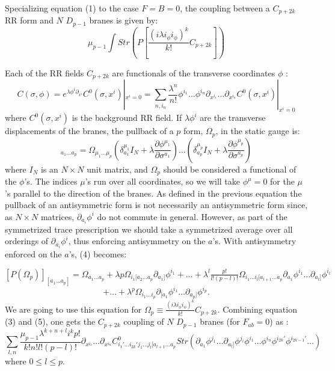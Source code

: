 \documentclass[a4paper,12pt]{article}
\begin{document}
Specializing equation (1) to the case $F=B=0$, the coupling between a $C_{p+2k}$ RR form and $N$ $D_{p-1}$ branes is given by:
\begin{equation}
 \mu_{p-1}\int Str\left(P\left[\frac{\left(i\lambda i_\phi i_\phi \right)^k}{k!} C_{p+2k} \right]\right)
\end{equation}

Each of the  RR fields $C_{p+2k}$ are functionals of the transverse coordinates $\phi$ :
\begin{equation}
C(\sigma,\phi) = e^{\lambda\phi^i\partial_{x^i}} C^0(\sigma,x^i)|_{x^i=0}=\sum_{n,{i_n}} \frac {\lambda^n}{n!} \phi^{i_1}\ldots \phi^{i_n} \partial_{x^{i_1}}\ldots \partial_{x^{i_n}} C^0(\sigma,x^i)|_{x^i=0}
\end{equation}
where $C^0(\sigma,x^i)$ is the background RR field.
If $\lambda \phi^i$ are the transverse displacements of the branes, the pullback of a $p$  form, $\Omega_p$, in the static gauge is:
\begin{equation}
[P(\Omega_p)]_{a_1\ldots a_p}= \Omega_{\mu_1\ldots \mu_p}\left(\delta_{a_1}^{\mu_1}I_N+\lambda\frac{\partial\phi^{\mu_1}}{\partial\sigma^{a_1}}\right)\ldots \left(\delta_{a_p}^{\mu_p}I_N+\lambda\frac{\partial\phi^{\mu_p}}{\partial\sigma^{a_p}}\right)
\end{equation}
where $I_N$  is an $N \times N$ unit matrix, and $\Omega_p$ should be considered a functional of the $\phi$'s.
The indices  $\mu$'s run over all coordinates, so we will take $\phi^\mu=0$ for the $\mu$'s parallel to the direction of the branes. As defined in the previous equation the pullback of an antisymmetric form is not necessarily an antisymmetric form since, as $N \times N$ matrices, $\partial_{a_i}\phi^i$ do not commute in general. However, as part of the symmetrized trace prescription we should take a symmetrized average over all orderings of $\partial_{a_i}\phi^i$, thus enforcing antisymmetry on  the $a$'s. \newline
 With antisymmetry enforced  on the $a$'s, (4) becomes: 

$[P(\Omega_p)]_{[a_1\ldots a_p]} = \Omega_{a_1\ldots a_p}+\lambda p\Omega_{i_1[a_2\ldots a_p}\partial_{a_1]}\phi^{i_1}+\ldots +\lambda^l\frac{p!}{l!(p-l)!}\Omega_{i_1\ldots i_l[a_{l+1}\ldots a_p}\partial_{a_1}\phi^{i_1}\ldots \partial_{a_l]}\phi^{i_l}$
\begin{equation}
+\ldots +\lambda^p \Omega_{i_1\ldots i_p}\partial_{[a_1}\phi^{i_1}\ldots \partial_{a_p]}\phi^{i_p}.
\end{equation}
We are going to use this equation for  $\Omega_p\equiv\frac{\left(i\lambda i_\phi i_\phi \right)^k}{k!} C_{p+2k}$.
Combining equation (3) and (5), one gets the $C_{p+2k}$ coupling of $N$ $D_{p-1}$ branes (for $F_{ab}=0$)  as :
\begin{equation}
\sum_{l,n} \frac{\mu_{p-1}\lambda^{k+n+l}i^kp!}{k!n!l!(p-l)!}\partial_{x^{i_1}}\ldots \partial_{x^{i_n}} C^0_{i_1'\ldots i_{2k}'j_1\ldots j_l[a_{l+1}\ldots a_p} Str \left(\partial_{a_1}\phi^{j_1}\ldots \partial_{a_l]}\phi^{j_l}\phi^{i_1}\ldots \phi^{i_n}\phi^{i_{2k}'}\phi^{i_{2k-1}'}\ldots \right)
\end{equation}
where   $0\le l\le p.$ 
\end{document}
